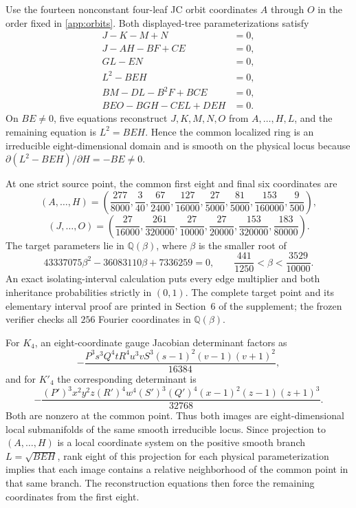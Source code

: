 \documentclass[11pt]{article}
\theoremstyle{remark}
\begin{document}
Use the fourteen nonconstant four-leaf JC orbit coordinates $A$ through $O$
in the order fixed in \cref{app:orbits}.  Both displayed-tree
parameterizations satisfy
\begin{align}
J-K-M+N&=0,\nonumber\\
J-AH-BF+CE&=0,\nonumber\\
GL-EN&=0,\nonumber\\
L^2-BEH&=0,\label{eq:weak-ideal}\\
BM-DL-B^2F+BCE&=0,\nonumber\\
BEO-BGH-CEL+DEH&=0.\nonumber
\end{align}
On $BE\ne0$, five equations reconstruct $J,K,M,N,O$ from
$A,\ldots,H,L$, and the remaining equation is $L^2=BEH$.  Hence the common
localized ring is an irreducible eight-dimensional domain and is smooth on
the physical locus because $\partial(L^2-BEH)/\partial H=-BE\ne0$.

At one strict source point, the common first eight and final six coordinates
are
\[
(A,\ldots,H)=
\left(\frac{277}{8000},\frac3{40},\frac{67}{2400},\frac{127}{16000},
\frac{27}{5000},\frac{81}{5000},\frac{153}{160000},\frac9{500}\right),
\]
\[
(J,\ldots,O)=
\left(\frac{27}{16000},\frac{261}{320000},\frac{27}{10000},
\frac{27}{20000},\frac{153}{320000},\frac{183}{80000}\right).
\]
The target parameters lie in $\mathbb Q(\beta)$, where $\beta$ is the smaller
root of
\begin{equation}\label{eq:beta}
43337075\beta^2-36083110\beta+7336259=0,\qquad
\frac{441}{1250}<\beta<\frac{3529}{10000}.
\end{equation}
An exact isolating-interval calculation puts every edge multiplier and both
inheritance probabilities strictly in $(0,1)$.  The complete target point and
its elementary interval proof are printed in Section~6 of the supplement;
the frozen verifier checks all $256$ Fourier coordinates in
$\mathbb Q(\beta)$.

For $K_4$, an eight-coordinate gauge Jacobian determinant factors as
\[
-\frac{P^3s^3Q^4tR^4u^3vS^3(s-1)^2(v-1)(v+1)^2}{16384},
\]
and for $K'_4$ the corresponding determinant is
\[
-\frac{(P')^3x^2y^2z(R')^4w^4(S')^3(Q')^4
(x-1)^2(z-1)(z+1)^3}{32768}.
\]
Both are nonzero at the common point.  Thus both images are
eight-dimensional local submanifolds of the same smooth irreducible locus.
Since projection to $(A,\ldots,H)$ is a local coordinate system on the
positive smooth branch $L=\sqrt{BEH}$, rank eight of this projection for each
physical parameterization implies that each image contains a relative
neighborhood of the common point in that same branch.  The reconstruction
equations then force the remaining coordinates from the first eight.
\end{document}
